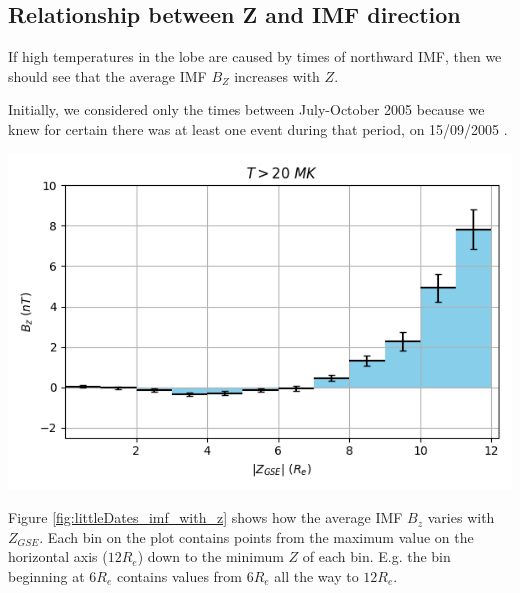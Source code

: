 \documentclass[12pt]{article}
\newenvironment{Figure}
  {\par\medskip\noindent\minipage{\linewidth}}
  {\endminipage\par\medskip}
\begin{document}
\subsection{Relationship between Z and IMF direction}
If high temperatures in the lobe are caused by times of northward IMF, then we should see that the average IMF $B_Z$ increases with $Z$. 

Initially, we considered only the times between July-October 2005 because we knew for certain there was at least one event during that period, on 15/09/2005 \cite{Fear1506}.

\begin{Figure}
    \begin{minipage}[c]{0.57\textwidth}
        \centering
        \includegraphics[width=\textwidth]{littleDates_imf_with_z.png}
    \end{minipage}
    \begin{minipage}[c]{0.4\textwidth}
        \label{fig:littleDates_imf_with_z}
    \end{minipage}
\end{Figure}

Figure \ref{fig:littleDates_imf_with_z} shows how the average IMF $B_z$ varies with $Z_{GSE}$. Each bin on the plot contains points from the maximum value on the horizontal axis ($12R_e$) down to the minimum $Z$ of each bin. E.g. the bin beginning at $6R_e$ contains values from $6R_e$ all the way to $12R_e$.
\end{document}
